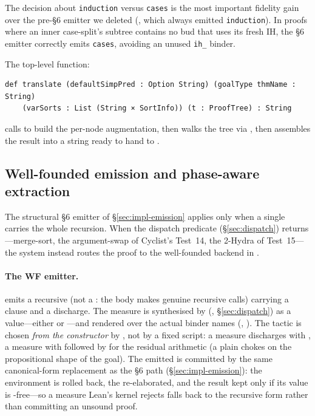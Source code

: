 The decision about \texttt{induction} versus \texttt{cases} is the most
important fidelity gain over the pre-§6 emitter we deleted
(, which always emitted \texttt{induction}). In
proofs where an inner case-split's subtree contains no bud that uses its
fresh IH, the §6 emitter correctly emits \texttt{cases}, avoiding an unused
\texttt{ih\_} binder.

The top-level function:

\begin{lstlisting}
def translate (defaultSimpPred : Option String) (goalType thmName : String)
    (varSorts : List (String × SortInfo)) (t : ProofTree) : String
\end{lstlisting}

calls  to build the per-node augmentation, then walks
the tree via , then assembles the result into a
 string ready to
hand to .

\subsection{Well-founded emission and phase-aware extraction}
\label{sec:impl-wf}

The structural §6 emitter of §\ref{sec:impl-emission} applies only when a
single  carries the whole recursion. When the dispatch
predicate  (§\ref{sec:dispatch}) returns
---merge-sort, the argument-swap of Cyclist's Test~14, the
2-Hydra of Test~15---the system instead routes the proof to the well-founded
backend in .

\paragraph{The WF emitter.}
 emits a recursive  (not a :
the body makes genuine recursive calls) carrying a
 clause and a  discharge.
The measure is synthesised by 
(, §\ref{sec:dispatch}) as a 
value---either  or ---and rendered over the
actual binder names (, ). The
 tactic is chosen \emph{from the 
constructor} by , not by a fixed script: a
 measure discharges with , a  measure
with  followed by  for the residual
arithmetic (a plain  chokes on the propositional shape of the
 goal). The emitted  is committed by the same
canonical-form replacement as the §6 path (§\ref{sec:impl-emission}): the
environment is rolled back, the  re-elaborated, and the result kept
only if its value is -free---so a measure Lean's kernel rejects
falls back to the recursive form rather than committing an unsound proof.

